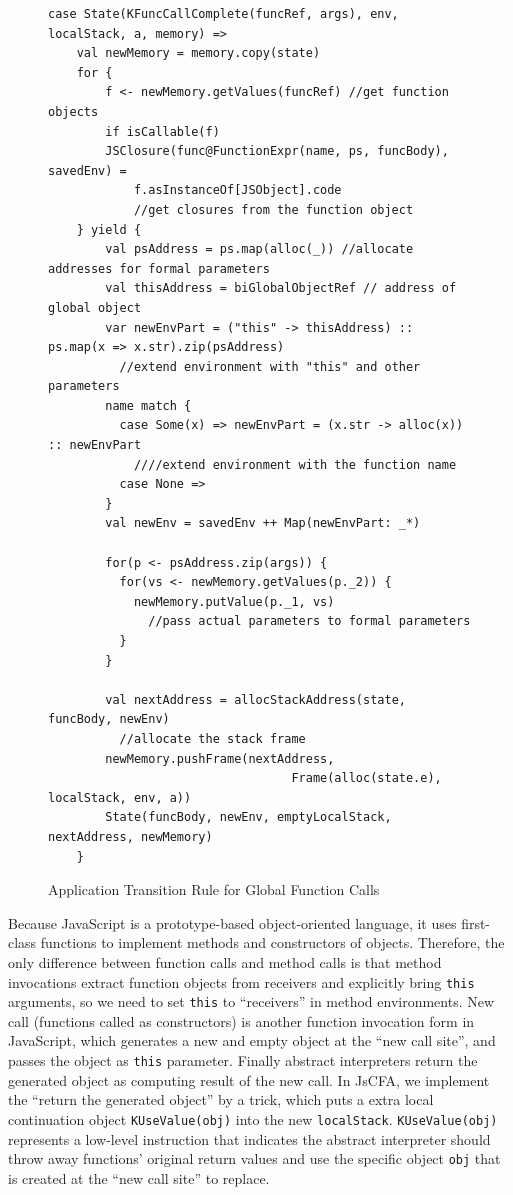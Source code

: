 \documentclass{article}
\begin{document}
\begin{figure}
  \lstset{language=Scala}
  \begin{lstlisting}
case State(KFuncCallComplete(funcRef, args), env, localStack, a, memory) =>
    val newMemory = memory.copy(state)
    for {
        f <- newMemory.getValues(funcRef) //get function objects
        if isCallable(f)
        JSClosure(func@FunctionExpr(name, ps, funcBody), savedEnv) =
            f.asInstanceOf[JSObject].code
            //get closures from the function object
    } yield {
        val psAddress = ps.map(alloc(_)) //allocate addresses for formal parameters
        val thisAddress = biGlobalObjectRef // address of global object
        var newEnvPart = ("this" -> thisAddress) :: ps.map(x => x.str).zip(psAddress)
          //extend environment with "this" and other parameters
        name match {
          case Some(x) => newEnvPart = (x.str -> alloc(x)) :: newEnvPart
            ////extend environment with the function name
          case None =>
        }
        val newEnv = savedEnv ++ Map(newEnvPart: _*)

        for(p <- psAddress.zip(args)) {
          for(vs <- newMemory.getValues(p._2)) {
            newMemory.putValue(p._1, vs)
              //pass actual parameters to formal parameters
          }
        }

        val nextAddress = allocStackAddress(state, funcBody, newEnv)
          //allocate the stack frame
        newMemory.pushFrame(nextAddress,
                                  Frame(alloc(state.e), localStack, env, a))
        State(funcBody, newEnv, emptyLocalStack, nextAddress, newMemory)
    }

  \end{lstlisting}
  \caption{Application Transition Rule for Global Function Calls}
\label{fig:app-call}
\end{figure}

Because JavaScript is a prototype-based object-oriented language, it uses first-class functions to implement methods and constructors of objects.
Therefore, the only difference between function calls and method calls is that method invocations extract function objects from receivers and explicitly bring \verb|this| arguments, so we need to set \verb|this| to ``receivers'' in method environments.
New call (functions called as constructors) is another function invocation form in JavaScript, which generates a new and empty object at the ``new call site'', and passes the object as \verb|this| parameter. Finally abstract interpreters return the generated object as computing result of the new call.
In JsCFA, we implement the ``return the generated object'' by a trick, which puts a extra local continuation object \verb|KUseValue(obj)| into the new \verb|localStack|.
\verb|KUseValue(obj)| represents a low-level instruction that indicates the abstract interpreter should throw away functions' original return values and use the specific object \verb|obj| that is created at the ``new call site'' to replace.
\end{document}
